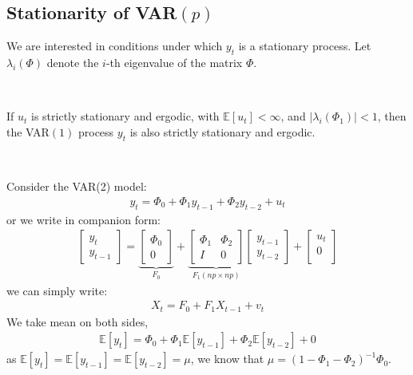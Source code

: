 \subsection{Stationarity of VAR\texorpdfstring{$(p)$}{(p)}}\label{sec:stationarity-var}
We are interested in conditions under which $y_t$ is a stationary process.
Let $\lambda_i(\Phi)$ denote the $i$-th eigenvalue of the matrix $\Phi$.
\begin{theorem}\label{thm:stationarity-var1}
    \

    If $u_t$ is strictly stationary and ergodic, with $\mathbb{E}[u_t] < \infty$, and $\vert \lambda_i(\Phi_1) \vert < 1$,
    then the VAR$(1)$ process $y_t$ is also strictly stationary and ergodic.
\end{theorem}
\begin{eg}
    \

    Consider the VAR(2) model:
    \begin{gather*}
        y_t = \Phi_0 + \Phi_1 y_{t-1} + \Phi_2 y_{t-2} + u_t
    \end{gather*}
    or we write in companion form:
    \begin{gather*}
        \begin{bmatrix}
            y_t \\
            y_{t-1}
        \end{bmatrix} = \underset{F_0}{\underbrace{\begin{bmatrix}
            \Phi_0 \\
            0
        \end{bmatrix}}} + 
        \underset{F_1(np \times np)}{\underbrace{\begin{bmatrix}
            \Phi_1 & \Phi_2 \\
            I & 0
        \end{bmatrix}}}
        \begin{bmatrix}
            y_{t-1} \\
            y_{t-2}
        \end{bmatrix} + \begin{bmatrix}
             u_t \\
             0 \\
        \end{bmatrix}
    \end{gather*}
    we can simply write:
    \begin{gather*}
        X_t = F_0 + F_1 X_{t-1} + v_t
    \end{gather*}
    We take mean on both sides,
    \begin{gather*}
        \mathbb{E}[y_t] = \Phi_0 + \Phi_1 \mathbb{E}[y_{t-1}] + \Phi_2 \mathbb{E}[y_{t-2}] + 0
    \end{gather*}
    as $\mathbb{E}[y_t] = \mathbb{E}[y_{t-1}] = \mathbb{E}[y_{t-2}] = \mu$,
    we know that $\mu = \left(1 - \Phi_1 - \Phi_2\right)^{-1} \Phi_0.$
\end{eg}
